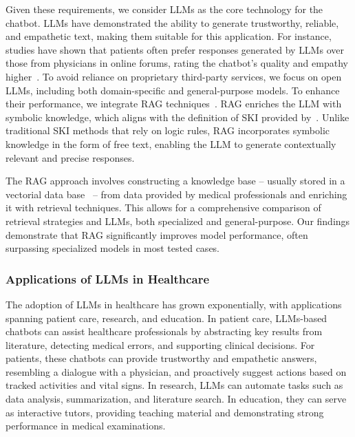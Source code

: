 %
Given these requirements, we consider \glspl{LLM} as the core technology for the chatbot.
%
\Glspl{LLM} have demonstrated the ability to generate trustworthy, reliable, and empathetic text, making them suitable for this application.
%
For instance, studies have shown that patients often prefer responses generated by \glspl{LLM} over those from physicians in online forums, rating the chatbot's quality and empathy higher~\cite{PLACEHOLDER3}.
%
To avoid reliance on proprietary third-party services, we focus on open \glspl{LLM}, including both domain-specific and general-purpose models.
%
To enhance their performance, we integrate \gls{RAG} techniques~\cite{PLACEHOLDER4}.
%
\Gls{RAG} enriches the \gls{LLM} with symbolic knowledge, which aligns with the definition of \gls{SKI} provided by~\cite{DBLP:journals/csur/CiattoSAMO24}.
%
Unlike traditional \gls{SKI} methods that rely on logic rules, \gls{RAG} incorporates symbolic knowledge in the form of free text, enabling the \gls{LLM} to generate contextually relevant and precise responses.

%
The \gls{RAG} approach involves constructing a knowledge base -- usually stored in a vectorial data base~\cite{vectorial-db} -- from data provided by medical professionals and enriching it with retrieval techniques.
%
This allows for a comprehensive comparison of retrieval strategies and \glspl{LLM}, both specialized and general-purpose.
%
Our findings demonstrate that \gls{RAG} significantly improves model performance, often surpassing specialized models in most tested cases.

%
\subsubsection{Applications of \Glspl{LLM} in Healthcare}
%
The adoption of \glspl{LLM} in healthcare has grown exponentially, with applications spanning patient care, research, and education.
%
In patient care, \glspl{LLM}-based chatbots can assist healthcare professionals by abstracting key results from literature, detecting medical errors, and supporting clinical decisions.
%
For patients, these chatbots can provide trustworthy and empathetic answers, resembling a dialogue with a physician, and proactively suggest actions based on tracked activities and vital signs.
%
In research, \glspl{LLM} can automate tasks such as data analysis, summarization, and literature search.
%
In education, they can serve as interactive tutors, providing teaching material and demonstrating strong performance in medical examinations.

